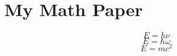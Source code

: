 \documentclass[11pt]{article}
\begin{document}
\section{
My Math Paper}



    $$E = h\nu$$
    $$E = \hbar\omega$$
    $$E = mc^2$$
\end{document}
